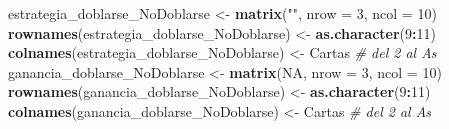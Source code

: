 \documentclass[12pt,a4paper,]{book}
\newenvironment{Shaded}{\begin{snugshade}}{\end{snugshade}}
\newcommand{\AttributeTok}[1]{\textcolor[rgb]{0.13,0.29,0.53}{#1}}
\newcommand{\CommentTok}[1]{\textcolor[rgb]{0.56,0.35,0.01}{\textit{#1}}}
\newcommand{\ConstantTok}[1]{\textcolor[rgb]{0.56,0.35,0.01}{#1}}
\newcommand{\DecValTok}[1]{\textcolor[rgb]{0.00,0.00,0.81}{#1}}
\newcommand{\FunctionTok}[1]{\textcolor[rgb]{0.13,0.29,0.53}{\textbf{#1}}}
\newcommand{\NormalTok}[1]{#1}
\newcommand{\OtherTok}[1]{\textcolor[rgb]{0.56,0.35,0.01}{#1}}
\newcommand{\SpecialCharTok}[1]{\textcolor[rgb]{0.81,0.36,0.00}{\textbf{#1}}}
\newcommand{\StringTok}[1]{\textcolor[rgb]{0.31,0.60,0.02}{#1}}
\numberwithin{dummy}{section}
\theoremstyle{ocrenumbox}
\theoremstyle{blacknumex}
\theoremstyle{blacknumbox}
\theoremstyle{ocrenum}
\theoremstyle{ocrenum}
\begin{document}
\begin{Shaded}
\begin{Highlighting}[]
\NormalTok{estrategia\_doblarse\_NoDoblarse }\OtherTok{\textless{}{-}} \FunctionTok{matrix}\NormalTok{(}\StringTok{""}\NormalTok{, }\AttributeTok{nrow =} \DecValTok{3}\NormalTok{, }\AttributeTok{ncol =} \DecValTok{10}\NormalTok{)}
\FunctionTok{rownames}\NormalTok{(estrategia\_doblarse\_NoDoblarse) }\OtherTok{\textless{}{-}} \FunctionTok{as.character}\NormalTok{(}\DecValTok{9}\SpecialCharTok{:}\DecValTok{11}\NormalTok{)}
\FunctionTok{colnames}\NormalTok{(estrategia\_doblarse\_NoDoblarse) }\OtherTok{\textless{}{-}}\NormalTok{ Cartas  }\CommentTok{\# del 2 al As}
\NormalTok{ganancia\_doblarse\_NoDoblarse }\OtherTok{\textless{}{-}} \FunctionTok{matrix}\NormalTok{(}\ConstantTok{NA}\NormalTok{, }\AttributeTok{nrow =} \DecValTok{3}\NormalTok{, }\AttributeTok{ncol =} \DecValTok{10}\NormalTok{)}
\FunctionTok{rownames}\NormalTok{(ganancia\_doblarse\_NoDoblarse) }\OtherTok{\textless{}{-}} \FunctionTok{as.character}\NormalTok{(}\DecValTok{9}\SpecialCharTok{:}\DecValTok{11}\NormalTok{)}
\FunctionTok{colnames}\NormalTok{(ganancia\_doblarse\_NoDoblarse) }\OtherTok{\textless{}{-}}\NormalTok{ Cartas  }\CommentTok{\# del 2 al As}


\end{Highlighting}
\end{Shaded}
\end{document}
